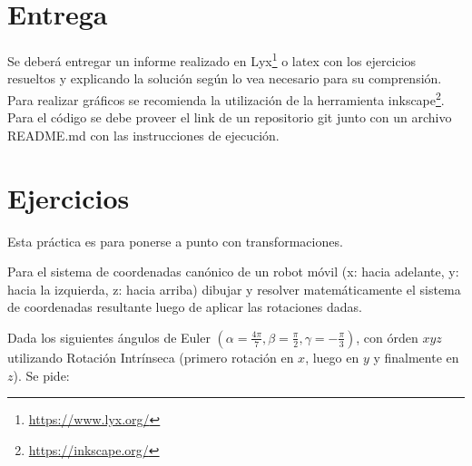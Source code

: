 \documentclass[tp]{lcc}
\begin{document}
\maketitle

\section{Entrega}
Se deberá entregar un informe realizado en Lyx\footnote{\url{https://www.lyx.org/}} o latex con los ejercicios resueltos y explicando la solución según lo vea necesario para su comprensión. Para realizar gráficos se recomienda la utilización de la herramienta inkscape\footnote{\url{https://inkscape.org/}}. Para el código se debe proveer el link de un repositorio git junto con un archivo README.md con las instrucciones de ejecución.

\section{Ejercicios}
Esta práctica es para ponerse a punto con transformaciones.

\ejercicio Para el sistema de coordenadas canónico de un robot móvil (x: hacia adelante, y: hacia la izquierda, z: hacia arriba) dibujar y resolver matemáticamente el sistema de coordenadas resultante luego de aplicar las rotaciones dadas.

    \begin{figure}[!h]
    \centering
    \hspace{-4cm}
    \hspace{3cm}
    \subfloat[$R_{y}(\SI{90}{\degree})$]
    {
        
    }
    \hspace{3cm}
    \hspace{3cm}
    \end{figure}
    
    
\ejercicio Dada los siguientes ángulos de Euler $(\alpha = \frac{4\pi}{7}, \beta = \frac{\pi}{2}, \gamma = -\frac{\pi}{3})$, con órden $xyz$ utilizando Rotación Intrínseca (primero rotación en $x$, luego en $y$ y finalmente en $z$). Se pide:
\end{document}
